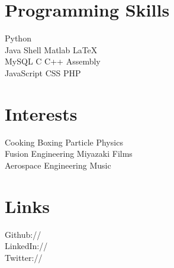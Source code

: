 \documentclass[]{resume-openfont}
\begin{document}
\begin{minipage}[t]{0.42\textwidth}
    \section{Programming Skills}
        Python \\
        Java \textbullet{}
        Shell \textbullet{}
        Matlab \textbullet{}
        \LaTeX\ \\
        MySQL \textbullet{}
        C \textbullet{}
        C++ \textbullet{}
        Assembly \\
        JavaScript \textbullet{}
        CSS \textbullet{}
        PHP \\
\end{minipage}
\hfill
\begin{minipage}[t]{0.35\textwidth}
    \section{Interests}
        Cooking \textbullet{}
        Boxing \textbullet{}
        Particle Physics \\
        Fusion Engineering \textbullet{}
        Miyazaki Films \\
        Aerospace Engineering \textbullet{}
        Music 
\end{minipage}
\hfill
\begin{minipage}[t]{0.22\textwidth}
    \section{Links}
        Github:// \href{https://github.com/paulkiernan}{}\\
        LinkedIn:// \href{https://www.linkedin.com/pub/paul-kiernan/24/a32/470}{}\\
        Twitter:// \href{https://twitter.com/gaelic}{}\\
\end{minipage}
\end{document}
